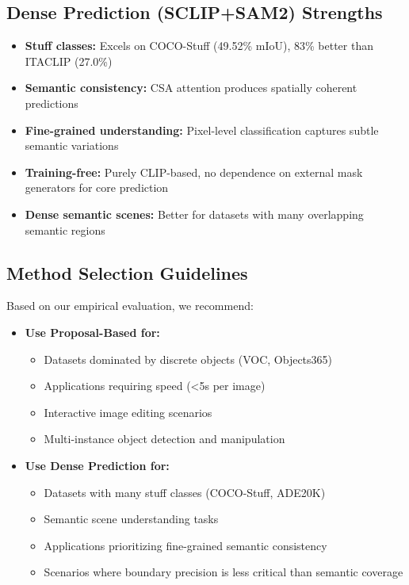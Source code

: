 \subsection{Dense Prediction (SCLIP+SAM2) Strengths}
\begin{itemize}
    \item \textbf{Stuff classes:} Excels on COCO-Stuff (49.52\% mIoU), 83\% better than ITACLIP (27.0\%)
    \item \textbf{Semantic consistency:} CSA attention produces spatially coherent predictions
    \item \textbf{Fine-grained understanding:} Pixel-level classification captures subtle semantic variations
    \item \textbf{Training-free:} Purely CLIP-based, no dependence on external mask generators for core prediction
    \item \textbf{Dense semantic scenes:} Better for datasets with many overlapping semantic regions
\end{itemize}

\subsection{Method Selection Guidelines}

Based on our empirical evaluation, we recommend:

\begin{itemize}
    \item \textbf{Use Proposal-Based for:}
    \begin{itemize}
        \item Datasets dominated by discrete objects (VOC, Objects365)
        \item Applications requiring speed (<5s per image)
        \item Interactive image editing scenarios
        \item Multi-instance object detection and manipulation
    \end{itemize}

    \item \textbf{Use Dense Prediction for:}
    \begin{itemize}
        \item Datasets with many stuff classes (COCO-Stuff, ADE20K)
        \item Semantic scene understanding tasks
        \item Applications prioritizing fine-grained semantic consistency
        \item Scenarios where boundary precision is less critical than semantic coverage
    \end{itemize}
\end{itemize}

